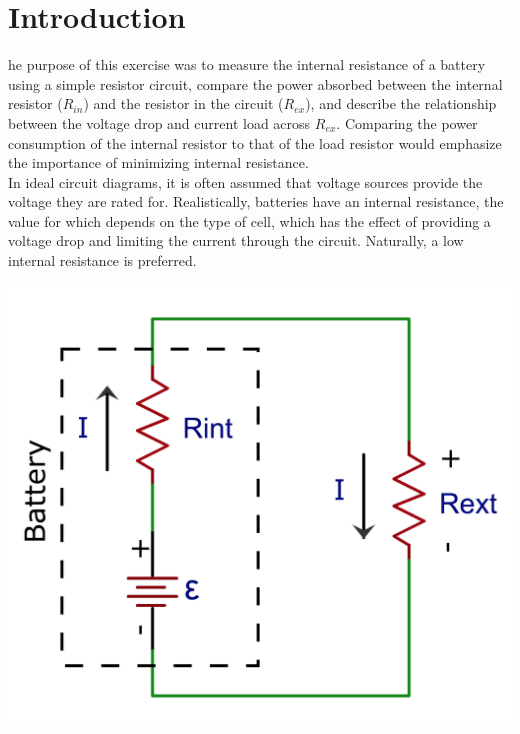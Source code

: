 \documentclass[journal]{IEEEtran}
\begin{document}




\section{Introduction}
\lowercase{he} purpose of this exercise was to measure the internal resistance of a battery using a simple resistor circuit, compare the power absorbed between the internal resistor ($R_{in}$) and the resistor in the circuit ($R_{ex}$), and describe the relationship between the voltage drop and current load across $R_{ex}$. Comparing the power consumption of the internal resistor to that of the load resistor would emphasize the importance of minimizing internal resistance.\\ 

\noindent In ideal circuit diagrams, it is often assumed that voltage sources provide the voltage they are rated for. Realistically, batteries have an internal resistance, the value for which depends on the type of cell, which has the effect of providing a voltage drop and limiting the current through the circuit. Naturally, a low internal resistance is preferred.

\begingroup
    \medskip
    \centering
    \includegraphics[width=\columnwidth]{images/lab3_1.png}
    \label{fig:first}
    \medskip
\endgroup
\end{document}
